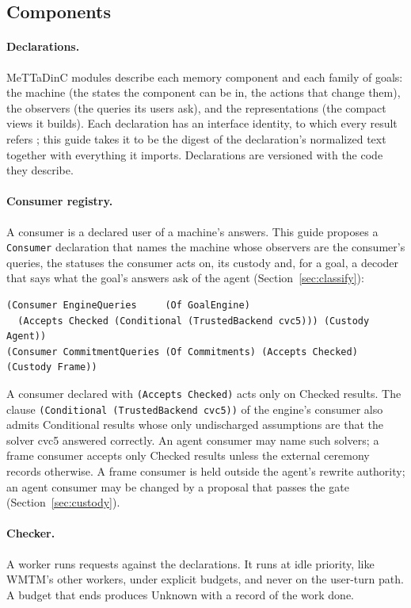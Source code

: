 \documentclass[11pt]{article}
\newcommand{\code}[1]{\texttt{#1}}
\theoremstyle{definition}
\theoremstyle{plain}
\begin{document}
\subsection{Components}

\paragraph{Declarations.} MeTTaDinC modules describe each memory component and each family of goals:
the machine (the states the component can be in, the actions that change them), the observers
(the queries its users ask), and the representations (the compact views it builds). Each
declaration has an interface identity, to which every result refers \cite{spec}; this guide
takes it to be the digest of the declaration's normalized text together with everything it
imports. Declarations are versioned with the code they describe.

\paragraph{Consumer registry.} A consumer is a declared user of a machine's answers. This guide
proposes a \code{Consumer} declaration that names the machine whose observers are the consumer's
queries, the statuses the consumer acts on, its custody and, for a goal, a decoder that says what
the goal's answers ask of the agent (Section~\ref{sec:classify}):
\begin{lstlisting}
(Consumer EngineQueries     (Of GoalEngine)
  (Accepts Checked (Conditional (TrustedBackend cvc5))) (Custody Agent))
(Consumer CommitmentQueries (Of Commitments) (Accepts Checked) (Custody Frame))
\end{lstlisting}
A consumer declared with \code{(Accepts Checked)} acts only on Checked results. The clause
\code{(Conditional (TrustedBackend cvc5))} of the engine's consumer also admits Conditional results
whose only undischarged assumptions are that the solver cvc5 answered correctly. An agent consumer
may name such solvers; a frame consumer accepts only Checked results unless the external ceremony
records otherwise. A frame consumer is held outside the agent's rewrite authority; an agent
consumer may be changed by a proposal that passes the gate (Section~\ref{sec:custody}).

\paragraph{Checker.} A worker runs requests against the declarations. It runs at idle priority,
like WMTM's other workers, under explicit budgets, and never on the user-turn path. A budget that
ends produces Unknown with a record of the work done.
\end{document}
